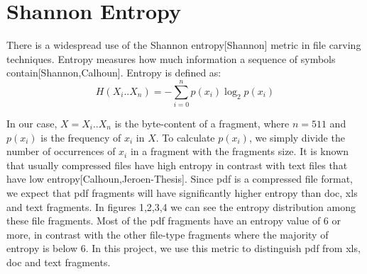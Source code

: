 \section{Shannon Entropy}
There is a widespread use of the Shannon entropy[Shannon] metric in file carving techniques. Entropy measures how much information a sequence of symbols contain[Shannon,Calhoun]. Entropy is defined as:
 \begin{displaymath}
 H({X_i}..{X_n})=-\sum_{i=0}^{n}{p({x_i})}\log_2{p({x_i})}
\end{displaymath} 

In our case, $X={X_i}..{X_n}$  is the byte-content of a fragment, where $n=511$  and $p({x_i})$ is the frequency of ${x_i}$ in ${X}$. To calculate $p({x_i})$, we simply divide the number of occurrences of ${x_i}$ in a fragment with the fragments size. It is known that usually compressed files have high entropy in contrast with text files that have low entropy[Calhoun,Jeroen-Thesis]. Since pdf is a compressed file format, we expect that pdf fragments will have significantly higher entropy than doc, xls and text fragments. In figures 1,2,3,4 we can see the entropy distribution among these file fragments. Most of the pdf fragments have an entropy value of 6 or more, in contrast with the other file-type fragments where the majority of entropy is below 6. In this project, we use this metric to distinguish pdf from xls, doc and text fragments.

